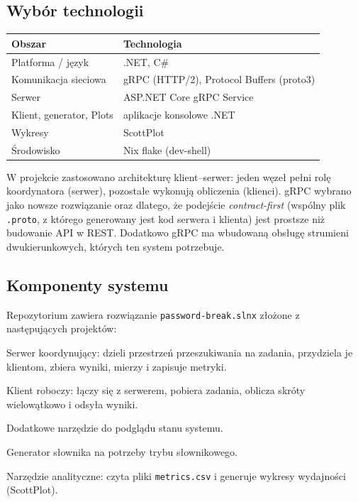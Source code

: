 \documentclass[11pt,a4paper]{article}
\begin{document}
\subsection{Wybór technologii}
\begin{center}
\begin{tabular}{@{}ll@{}}
\toprule
\textbf{Obszar} & \textbf{Technologia} \\
\midrule
Platforma / język          & .NET, C\# \\
Komunikacja sieciowa       & gRPC (HTTP/2), Protocol Buffers (proto3) \\
Serwer                     & ASP.NET Core gRPC Service \\
Klient, generator, Plots   & aplikacje konsolowe .NET \\
Wykresy                    & ScottPlot \\
Środowisko        & Nix flake (dev-shell) \\
\bottomrule
\end{tabular}
\end{center}

W projekcie zastosowano architekturę klient--serwer: jeden węzeł pełni rolę koordynatora
(serwer), pozostałe wykonują obliczenia (klienci). gRPC wybrano jako nowsze rozwiązanie
oraz dlatego, że podejście \emph{contract-first} (wspólny plik \texttt{.proto}, z którego
generowany jest kod serwera i klienta) jest prostsze niż budowanie API w REST. Dodatkowo gRPC
ma wbudowaną obsługę strumieni dwukierunkowych, których ten system potrzebuje.

\subsection{Komponenty systemu}
Repozytorium zawiera rozwiązanie \texttt{password-break.slnx} złożone z następujących projektów:
\begin{description}[style=nextline,leftmargin=0pt]
  \item[\texttt{password-break-server}] Serwer koordynujący: dzieli przestrzeń przeszukiwania na
        zadania, przydziela je klientom, zbiera wyniki, mierzy i zapisuje metryki.
  \item[\texttt{password-break-client}] Klient roboczy: łączy się z serwerem, pobiera zadania,
        oblicza skróty wielowątkowo i odsyła wyniki.
  \item[\texttt{password-break-monitor}] Dodatkowe narzędzie do podglądu stanu systemu.
  \item[\texttt{password-break-wordlist-generator}] Generator słownika na potrzeby trybu słownikowego.
  \item[\texttt{Plots}] Narzędzie analityczne: czyta pliki \texttt{metrics.csv} i generuje wykresy
        wydajności (ScottPlot).
\end{description}
\end{document}
